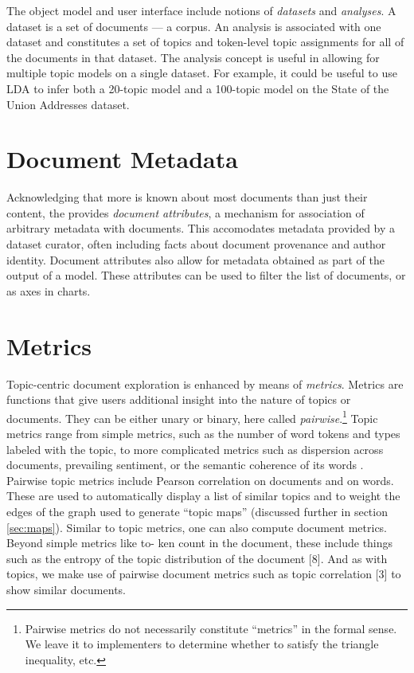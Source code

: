\documentclass[11pt]{article}
\begin{document}
The \tool{} object model and user interface include notions of
\textit{datasets} and \textit{analyses}.
A dataset is a set of documents --- a corpus. An analysis is associated with one
dataset and constitutes a set of topics and token-level topic assignments for
all of the documents in that dataset. The analysis concept is useful in
allowing for multiple topic models on a single dataset. For example,
it could be useful to use LDA to infer both a 20-topic model and a 100-topic model
on the State of the Union Addresses dataset.

\section{Document Metadata}
Acknowledging that more is known about most documents than just their content,
the \tool{} provides \textit{document attributes}, a mechanism for association
of arbitrary metadata with documents. This accomodates metadata
provided by a dataset curator, often including facts about document
provenance and author identity. Document attributes also allow for metadata
obtained as part of the output of a model. These attributes can be used to
filter the list of documents, or as axes in charts.

\section{Metrics}
Topic-centric document exploration is enhanced by means of \textit{metrics}.
Metrics are functions that give users additional insight into the nature of
topics or documents. They can be either unary or binary, here called
\textit{pairwise}.\footnote{Pairwise metrics do not necessarily constitute
``metrics'' in the formal sense. We leave it to implementers to determine
whether to satisfy the triangle inequality, etc.} Topic metrics range from
simple metrics, such as the number of word tokens and types labeled with the
topic, to more complicated metrics such as dispersion across documents,
prevailing sentiment, or the semantic coherence of its words \cite{Newman2010}.
Pairwise topic metrics include Pearson correlation on documents and on words.
These are used to automatically display a list of similar topics and to weight
the edges of the graph used to generate ``topic maps'' (discussed further in section
\ref{sec:maps}). Similar to topic metrics, one can also compute document
metrics. Beyond simple metrics like to- ken count in the document, these include
things such as the entropy of the topic distribution of the document [8]. And as
with topics, we make use of pairwise document metrics such as topic%
correlation [3] to show similar documents.%
\end{document}
